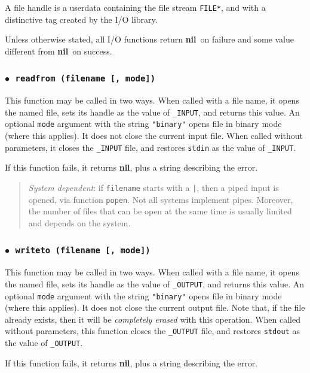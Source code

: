 \documentclass[11pt]{article}
\newcommand{\T}[1]{{\tt #1}}
\newcommand{\nil}{{\bf nil}}
\newcommand{\Index}[1]{#1\index{#1}}
\newcommand{\IndexVerb}[1]{\T{#1}\index{#1}}
\newcommand{\Deffunc}[1]{\index{#1}}
\newcommand{\ff}{$\bullet$\ }
\begin{document}
A file handle is a userdata containing the file stream \verb|FILE*|,
and with a distinctive tag created by the I/O library.


Unless otherwise stated,
all I/O functions return \nil\ on failure and
some value different from \nil\ on success.

\subsubsection*{\ff \T{readfrom (filename [, mode])}}\Deffunc{readfrom}

This function may be called in two ways.
When called with a file name, it opens the named file,
sets its handle as the value of \verb|_INPUT|,
and returns this value.
An optional \verb|mode| argument with the string \verb|"binary"|
opens file in binary mode (where this applies).
It does not close the current input file.
When called without parameters,
it closes the \verb|_INPUT| file,
and restores \verb|stdin| as the value of \verb|_INPUT|.

If this function fails, it returns \nil,
plus a string describing the error.

\begin{quotation}
\noindent
\emph{System dependent}: if \verb|filename| starts with a \verb-|-,
then a \Index{piped input} is opened, via function \IndexVerb{popen}.
Not all systems implement pipes.
Moreover,
the number of files that can be open at the same time is
usually limited and depends on the system.
\end{quotation}

\subsubsection*{\ff \T{writeto (filename [, mode])}}\Deffunc{writeto}

This function may be called in two ways.
When called with a file name,
it opens the named file,
sets its handle as the value of \verb|_OUTPUT|,
and returns this value.
An optional \verb|mode| argument with the string \verb|"binary"|
opens file in binary mode (where this applies).
It does not close the current output file.
Note that, if the file already exists,
then it will be \emph{completely erased} with this operation.
When called without parameters,
this function closes the \verb|_OUTPUT| file,
and restores \verb|stdout| as the value of \verb|_OUTPUT|.

If this function fails, it returns \nil,
plus a string describing the error.
\end{document}

